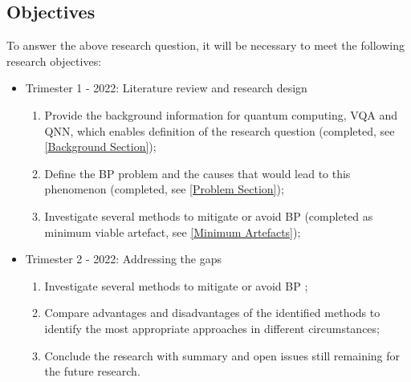 \subsection{Objectives}
To answer the above research question, it will be necessary to meet the following research objectives:
\begin{itemize}
    \item Trimester 1 - 2022: Literature review and research design
    \begin{enumerate}
        \item Provide the background information for quantum computing, VQA and QNN, which enables definition of the research question (completed, see \ref{Background Section});
        \item Define the BP problem and the causes that would lead to this phenomenon \cite{wangNoiseinducedBarrenPlateaus2021,zhaoAnalyzingBarrenPlateau2021} (completed, see \ref{Problem Section});
        \item Investigate several methods to mitigate or avoid BP \cite{pesahAbsenceBarrenPlateaus2021, pattiEntanglementDevisedBarren2021,liuParameterInitializationMethod2021} (completed as minimum viable artefact, see \ref{Minimum Artefacts});
    \end{enumerate}
    \item Trimester 2 - 2022: Addressing the gaps
    \begin{enumerate}
        \item Investigate several methods to mitigate or avoid BP \cite{pesahAbsenceBarrenPlateaus2021, pattiEntanglementDevisedBarren2021,liuParameterInitializationMethod2021};
    \item Compare advantages and disadvantages of the identified methods to identify the most appropriate approaches in different circumstances;
    \item Conclude the research with summary and open issues still remaining for the future research.
    \end{enumerate}
\end{itemize}